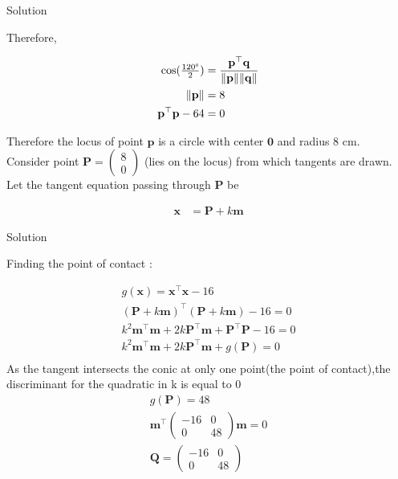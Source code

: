 \documentclass{beamer}
\numberwithin{equation}{section}
\theoremstyle{remark}
\providecommand{\norm}[1]{\lVert#1\rVert}
\newcommand{\myvec}[1]{\ensuremath{\begin{pmatrix}#1\end{pmatrix}}}
\let\vec\mathbf
\begin{document}
\begin{frame}{Solution}


Therefore,

\begin{align}
  \cos(\tfrac{120\degree}{2}) &= \frac{\vec{p}^\top\vec{q}}{\norm{\vec{p}}\norm{\vec{q}}}\\
  \norm{\vec{p}} &= 8\\
  \vec{p}^\top\vec{p} - 64 &= 0
\end{align}

Therefore the locus of point $\vec{p}$ is a circle with center $\vec{0}$ and radius 8 cm.\\

Consider point $\vec{P} = \myvec{8\\0}$ (lies on the locus) from which tangents are drawn.\\

Let the tangent equation passing through $\vec{P}$ be 

\begin{align}
  \vec{x} &= \vec{P} + k\vec{m}
\end{align}

\end{frame}

\begin{frame}{Solution}

Finding the point of contact :

\begin{align}
  g(\vec{x}) = \vec{x}^\top\vec{x} - 16 \label{eq:circle}\\
  (\vec{P}+k\vec{m})^\top(\vec{P}+k\vec{m}) - 16 = 0\\
  k^2\vec{m}^\top\vec{m} + 2k\vec{P}^\top\vec{m} + \vec{P}^\top\vec{P} - 16 = 0\\
  k^2\vec{m}^\top\vec{m} + 2k\vec{P}^\top\vec{m} + g(\vec{P}) = 0\\
\end{align}
As the tangent intersects the conic at only one point(the point of contact),the discriminant for the quadratic in k is equal to 0
\begin{align}
    g(\vec{P}) = 48\\
  \vec{m}^\top\myvec{-16 & 0\\0 & 48}\vec{m} = 0 \label{eq:mqm} \\
  \vec{Q} = \myvec{-16 & 0\\0 & 48}\\ 
\end{align}

\end{frame}
\end{document}
